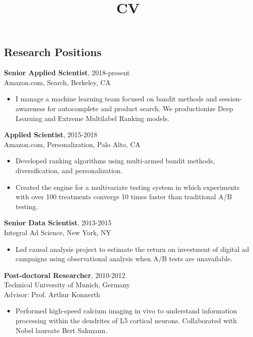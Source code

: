 \documentclass[line,11pt]{res}
\title{CV}
\begin{document}
 
\thispagestyle{empty} %
\address{246 $2^{nd}$ St. \#1401, San Francisco, CA 94105}
\address{716.771.8224}
\address{daniel.n.hill@gmail.com}
\address{www.danielnhill.com}

\begin{resume}

\section{Research Positions}
\vspace{0.1in} 

 {\bf Senior Applied Scientist}, 2018-present \\ Amazon.com, Search, Berkeley, CA 
  \begin{itemize}
          \item[] I manage a machine learning team focused on bandit methods and session-awareness for autocomplete and product search. We productionize Deep Learning and Extreme Multilabel Ranking models.
   \end{itemize}

 {\bf Applied Scientist}, 2015-2018 \\ Amazon.com, Personalization, Palo Alto, CA 
  \begin{itemize}
          \item[] Developed ranking algorithms using multi-armed bandit methods, diversification, and personalization.  
         \item[] Created the engine for a multivariate testing system in which experiments with over 100 treatments converge 10 times faster than traditional A/B testing.  
   \end{itemize}
   
 {\bf Senior Data Scientist}, 2013-2015 \\ Integral Ad Science, New York, NY 
  \begin{itemize}
          \item[] Led causal analysis project to estimate the return on investment of digital ad campaigns using observational analysis when A/B tests are unavailable.
   \end{itemize}
   
 {\bf Post-doctoral Researcher}, 2010-2012 \\ Technical University of Munich, Germany 
 \\ Advisor: Prof. Arthur Konnerth
  \begin{itemize}
        \item[] Performed high-speed calcium imaging in vivo to understand information processing within the dendrites of L5 cortical neurons.  Collaborated with Nobel laureate Bert Sakmann.
  \end{itemize}
    

\end{resume}
\end{document}
